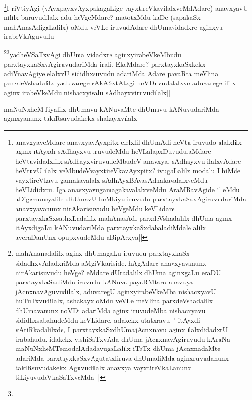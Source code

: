 \begin{artha}
\footnote{anavxyaveMdare anavxyavAyxpitx elelxlil dhUmAdi heVtu iruvudo alalxlilx aginx itAyxdi sAdhayxvu iruvudeMdu heVLalapxDuvudu.aMdare heVtuvidadxlilx sAdhayxviruvudeMbudeV anavxya, sAdhayxvu ilalxvAdare heVtuvU ilalx veMbudeVvayxtireVkavAyxpitx? ivugaLalilx modalu I hiMde vayxtireVkavu gamakavalalx sAdhAyxBAvasAdhakavalalxveMdu heVLididxtu. Iga anavxyavugamagakavalalxveMdu AraMBavAgide `\stext' eMdu aDigemaneyalilx dhUmavU beMkiyu iruvudu parxtayxkaSxvAgiruvudariMda anavxyavanunx nirAkarisuvudu heVgeMdu keVLidare parxtayxkaSxsathxLadalilx mahAnasAdi parxdeVshadalilx dhUma aginx itAyxdigaLu kANuvudariMda parxtayxkaSxdabaladiMdale alilx averaDanUnx opupxvudeMdu aBipArxya||}I riVtiyAgi (vAyxpayxvAyxpakagaLige vayxtireVkavilalxveMdAdare) anavxyavU nililx baruvudilalx adu heVgeMdare? matotxMdu kaDe (sapakaSx mahAnasAdigaLalilx) oMdu veVLe iruvudAdare dhUmavidadxre aginxyu irabeVkAguvudu||
\end{artha}

\begin{artha}
\footnote{mahAnanadalilx aginx dhUmagaLu iruvudu parxtayxkaSx sidadhxvAdadxriMda aMgiVkariside. hAgAdare anavxyavanunx nirAkarisuvudu heVge? eMdare dUradalilx dhUma aginxgaLu eraDU parxtayxkaSxdiMda iruvudu kANuva payaRMtara anavxya jAcnxnavAguvudilalx, aduvaregU aginxyirabeVkeMba nishacxyavU huTuTxvudilalx, ashakayx oMdu veVLe meVlina parxdeVshadalilx dhUmavanunx noVDi adariMda aginx iruvudeMba nishacxyavu sididhxsabahudeMdu keVLidare. adakekx utatxravu `\stext' itAyxdi vAtiRkadalilxde, I parxtayxkaSxdhUmajAcnxnavu aginx ilalxdidadxrU irabahudu. idakekx vishiSaTxvAda dhUma jAcnxnavAgiruvudu kAraNa maNuNxheMTemodalAdadavugaLalilx iTaTx dhUma jAcnxnadaMte adariMda parxtayxkaSxvAgutatxliruva dhUmadiMda aginxruvudanunx takiRsuvudakekx Aguvudilalx anavxya vayxtireVkaLanunx tiLiyuvudeVkaSaTxveMda ||}\footnote{}yadheVSaTxvAgi dhUma vidadxre aginxyirabeVkeMbudu parxtayxkaSxvAgiruvudariMda irali. EkeMdare? parxtayxkaSxkekx adiVnavAgiye elalxvU sididhxsuvudu adariMda Adare pavaRta meVlina parxdeVshadalilx yaduvarege sAkASxtAtxgi noVDuvudalalxvo aduvarege ililx aginx irabeVkeMdu nishacxyisalu sAdhayxviruvudilalx||
\end{artha}

\begin{artha}
maNuNxheMTiyalilx dhUmavu kANuvaMte dhUmavu kANuvudariMda aginxyanunx takiRsuvudakekx  shakayxvilalx||
\end{artha}

